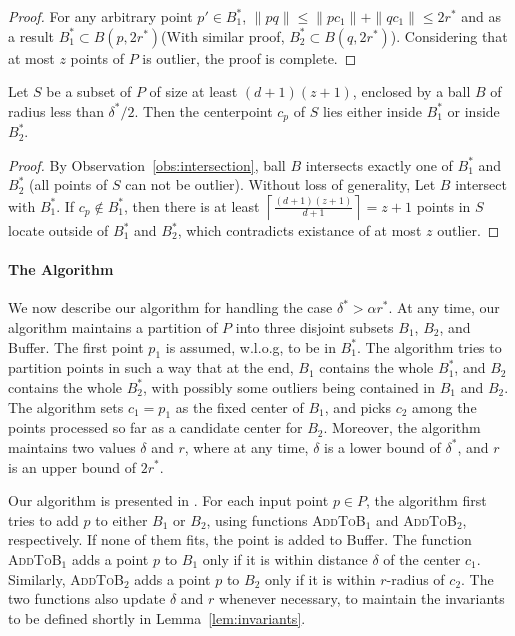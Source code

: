 \documentclass[envcountsame]{cls/cccg15}
\newcommand{\rc}{r}
\newcommand{\dz}{(d + 1)(z + 1)}
\newcommand{\textproc}{\textsc}
\newcommand{\ceil}[1]{\left\lceil{#1}\right\rceil}
\newcommand{\len}[1]{\|{#1}\|}
\newcommand{\lee}{\leqslant}
\renewcommand{\leq}{\lee}
\begin{document}
\begin{proof}
	For any arbitrary point $p' \in B_1^*$, $\len{pq} \leq \len{pc_1} + \len{qc_1} \leq 2r^*$ and as a result $B_1^* \subset B(p, 2r^*)$(With similar proof, $B_2^* \subset B(q, 2r^*)$).  Considering that at most $z$ points of $P$ is outlier,  the proof is complete.
\end{proof}

\begin{lemma}
\label{lem:center-point}
	Let $S$ be a subset of $P$ of size at least $\dz$,
	enclosed by a ball $B$ of radius less than $\delta^* / 2$.
	Then the centerpoint $c_p$ of $S$ lies either inside $B_1^{*}$ or inside $B_2^{*}$.
\end{lemma}

\begin{proof}
	By Observation~\ref{obs:intersection}, ball $B$ intersects exactly one of $B_1^*$ and $B_2^*$ (all points of $S$ can not be outlier). Without loss of generality, Let $B$ intersect with $B_1^*$. If $c_p \not \in B_1^*$, then there is at least $\ceil{\frac{\dz}{d+1}} = z+1$ points in $S$ locate outside of $B_1^*$ and $B_2^*$, which contradicts existance of at most $z$ outlier.
\end{proof}

\paragraph{The Algorithm}
We now describe our algorithm for handling the case  $\delta^* > \alpha r^*$.
At any time, our algorithm maintains a partition of $P$ into three disjoint subsets
$B_1$, $B_2$, and Buffer.
The first point $p_1$ is assumed, w.l.o.g, to be in $B_1^*$. 
The algorithm tries to partition points in such a way that 
at the end,
$B_1$ contains the whole $B_1^*$, and $B_2$ contains the whole $B_2^*$,
with possibly some outliers being contained in $B_1$ and $B_2$.
The algorithm sets $c_1 = p_1$ as the fixed center of $B_1$,
and picks $c_2$ among the points processed so far as a candidate center for $B_2$.
Moreover, the algorithm maintains two values $\delta$ and $r$,
where at any time, $\delta$ is a lower bound of $\delta^*$, 
and $r$ is an upper bound of $2r^*$.

Our algorithm is presented in .
For each input point $p \in P$, the algorithm first tries 
to add $p$ to either $B_1$ or $B_2$,
using functions \textproc{AddToB$_1$} and \textproc{AddToB$_2$}, respectively.
If none of them fits, the point is added to Buffer.
The function \textproc{AddToB$_1$} adds a point $p$ to $B_1$
only if it is within distance $\delta$ of the center $c_1$.
Similarly, \textproc{AddToB$_2$} adds a point $p$ to $B_2$
only if it is within $\rc$-radius of $c_2$. 
The two functions also update $\delta$ and $\rc$ whenever necessary,
to maintain the invariants to be defined shortly in Lemma~\ref{lem:invariants}.
\end{document}
